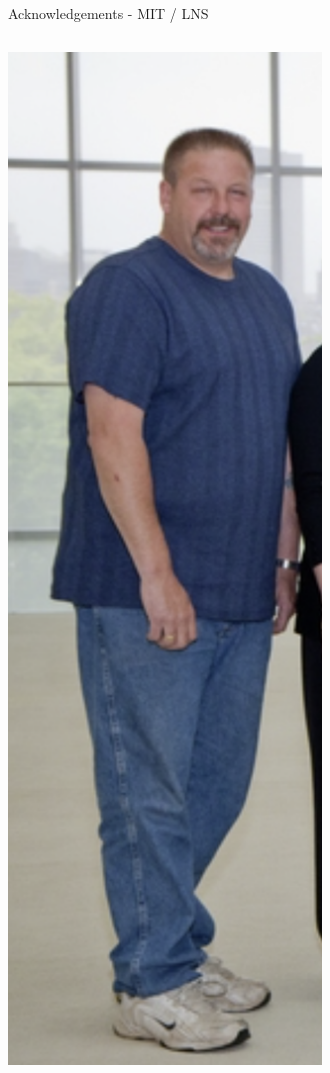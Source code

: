 \documentclass[aspectratio=169]{beamer}
\begin{document}
\begin{frame}{Acknowledgements - MIT / LNS}
\begin{columns}
            \includegraphics[width=0.99\textwidth]{people/lns/jack.png}


\end{columns}
\end{frame}
\end{document}
